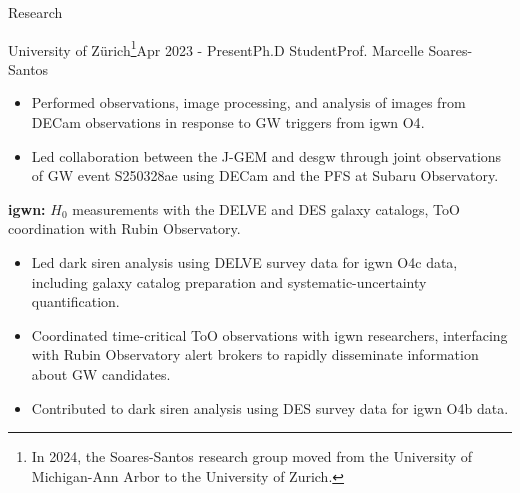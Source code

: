 \documentclass{resume} %
\begin{document}
\begin{rSection}{Research}
\begin{rSubsection}{University of Zürich\footnote{In 2024, the Soares-Santos research group moved from the University of Michigan-Ann Arbor to the University of Zurich.}}{Apr 2023 - Present}{Ph.D Student}{Prof. Marcelle Soares-Santos}
\begin{itemize}
         \item Performed observations, image processing, and analysis of images from \ac{DECam} observations in response to \ac{GW} triggers from \ac{igwn} \ac{O4}. 
         \item Led collaboration between the \ac{J-GEM} and \ac{desgw} through joint observations of \ac{GW} event S250328ae using \ac{DECam} and the \ac{PFS} at Subaru Observatory.
     \end{itemize}
     \item \textbf{\ac{igwn}:} $H_0$ measurements with the \ac{DELVE} and \ac{DES} galaxy catalogs, \ac{ToO} coordination with Rubin Observatory.
     \begin{itemize}
         \item Led dark siren analysis using \ac{DELVE} survey data for \ac{igwn} O4c data, including galaxy catalog preparation and systematic-uncertainty quantification.
         \item Coordinated time-critical \ac{ToO} observations with \ac{igwn} researchers, interfacing with Rubin Observatory alert brokers to rapidly disseminate information about \ac{GW} candidates.
         \item Contributed to dark siren analysis using \ac{DES} survey data for \ac{igwn} O4b data.
     \end{itemize}  
     
   

\end{rSubsection}
\end{rSection}
\end{document}
